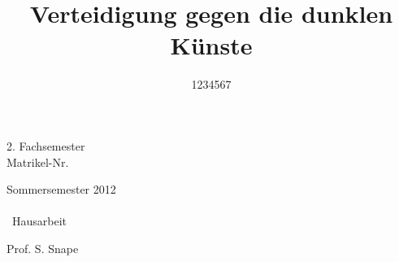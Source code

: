 \begin{titlepage}


\title{Verteidigung gegen die dunklen Künste}
\newcommand{\Aufgabensteller}{Prof. S. Snape}
\newcommand{\Semesteranzahl}{2. Fachsemester}
\newcommand{\Semester}{Sommersemester 2012}
\author{1234567}



\begin{flushright}
\makeatletter
\Semesteranzahl \\
Matrikel-Nr.~\textbf{\noindent\@author}\\
\hfill\@date
\makeatother
\end{flushright}


\begin{center}
\vspace*{4cm}

{\normalfont
\bfseries\hrulefill

\makeatletter
\Semester\\
\Huge\@title\\
\vspace{0.5cm}
\LARGE\ Hausarbeit
\makeatother

\vspace{1cm}

{\LARGE\Aufgabensteller}

\hrulefill}


\end{center}
\end{titlepage}
